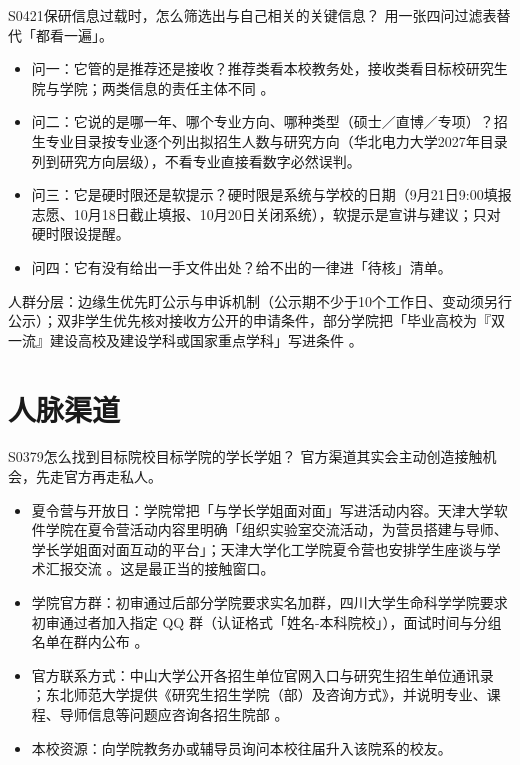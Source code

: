 \begin{qa}{S0421}{保研信息过载时，怎么筛选出与自己相关的关键信息？}
用一张四问过滤表替代「都看一遍」。
\begin{itemize}
  \item 问一：它管的是推荐还是接收？推荐类看本校教务处，接收类看目标校研究生院与学院；两类信息的责任主体不同 。
  \item 问二：它说的是哪一年、哪个专业方向、哪种类型（硕士／直博／专项）？招生专业目录按专业逐个列出拟招生人数与研究方向（华北电力大学2027年目录列到研究方向层级），不看专业直接看数字必然误判。
  \item 问三：它是硬时限还是软提示？硬时限是系统与学校的日期（9月21日9:00填报志愿、10月18日截止填报、10月20日关闭系统），软提示是宣讲与建议；只对硬时限设提醒。
  \item 问四：它有没有给出一手文件出处？给不出的一律进「待核」清单。
\end{itemize}
人群分层：边缘生优先盯公示与申诉机制（公示期不少于10个工作日、变动须另行公示）；双非学生优先核对接收方公开的申请条件，部分学院把「毕业高校为『双一流』建设高校及建设学科或国家重点学科」写进条件 。
\end{qa}

\section{人脉渠道}
\begin{qa}{S0379}{怎么找到目标院校目标学院的学长学姐？}
官方渠道其实会主动创造接触机会，先走官方再走私人。
\begin{itemize}
  \item 夏令营与开放日：学院常把「与学长学姐面对面」写进活动内容。天津大学软件学院在夏令营活动内容里明确「组织实验室交流活动，为营员搭建与导师、学长学姐面对面互动的平台」；天津大学化工学院夏令营也安排学生座谈与学术汇报交流 。这是最正当的接触窗口。
  \item 学院官方群：初审通过后部分学院要求实名加群，四川大学生命科学学院要求初审通过者加入指定 QQ 群（认证格式「姓名-本科院校」），面试时间与分组名单在群内公布 。
  \item 官方联系方式：中山大学公开各招生单位官网入口与研究生招生单位通讯录 ；东北师范大学提供《研究生招生学院（部）及咨询方式》，并说明专业、课程、导师信息等问题应咨询各招生院部 。
  \item 本校资源：向学院教务办或辅导员询问本校往届升入该院系的校友。
\end{itemize}
\end{qa}

